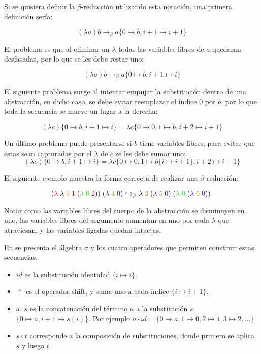\documentclass[]{report}
\begin{document}
	Si se quisiera definir la $\beta$-reducción utilizando esta notación, una primera definición sería:
	
	\[ (\lambda a)b \rightarrow_{\beta} a \{ 0 \mapsto b, i+1\mapsto i+1 \} \]
	
	El problema es que al eliminar un $\lambda$ todas las variables libres de $a$ quedaran desfasadas, por lo que se les debe restar uno:
	
	\[ (\lambda a)b \rightarrow_{\beta} a \{ 0 \mapsto b, i+1\mapsto i \} \]
	
	El siguiente problema surge al intentar empujar la substitución dentro de una abstracción, en dicho caso, se debe evitar reemplazar el índice 0 por $b$, por lo que toda la secuencia se mueve un lugar a la derecha:
	
	\[ (\lambda c)\{ 0 \mapsto b, i+1\mapsto i \} = \lambda c \{ 0 \mapsto 0, 1 \mapsto b, i+2\mapsto i+1 \} \]
	
	Un último problema puede presentarse si $b$ tiene variables libres, para evitar que estas sean capturadas por el $\lambda$ de $c$ se les debe sumar uno:
	\[ (\lambda c)\{ 0 \mapsto b, i+1\mapsto i \} = \lambda c \{ 0 \mapsto 0, 1 \mapsto b \{ i \mapsto i+1 \}, i+2\mapsto i+1 \} \]
	
	El siguiente ejemplo muestra la forma correcta de realizar una $\beta$ reducción:
	
	\[
	(\textcolor{red}{\lambda}\; \lambda\; \textcolor{orange}{3}\; \textcolor{red}{1}\; (\textcolor{green}{\lambda\; 0}\; \textcolor{red}{2}))\; (\textcolor{blue}{\lambda}\; \textcolor{orange}{4}\; \textcolor{blue}{0})
	\hookrightarrow_\beta
	\lambda \; \textcolor{orange}{2} \; (\textcolor{blue}{\lambda}\; \textcolor{orange}{5}\; \textcolor{blue}{0})\; (\textcolor{green}{\lambda\; 0}\; (\textcolor{blue}{\lambda}\; \textcolor{orange}{6}\; \textcolor{blue}{0}))\;
	\]
	
	Notar como las variables libres del cuerpo de la abstracción se disminuyen en uno, las variables libres del argumento aumentan en uno por cada $\lambda$ que atraviesan, y las variables ligadas quedan intactas.
	
	
	En \cite{explicit_subs} se presenta el álgebra $\sigma$ y los cuatro operadores que permiten construir estas secuencias.

	\begin{itemize}
		\item $id$ es la substitución identidad $\{i \mapsto i\}$.
		\item $\uparrow$ es el operador shift, y suma uno a cada índice $\{i \mapsto i+1\}$.
		\item $a \cdot s$ es la concatenación del término $a$ a la substitución $s$, $\{0 \mapsto a, i+1 \mapsto s(i)\}$. Por ejemplo $a \cdot id = \{ 0 \mapsto a, 1 \mapsto 0, 2 \mapsto 1, 3 \mapsto 2, \dots \} $
		\item $s \circ t$ corresponde a la composición de substituciones, donde primero se aplica $s$ y luego $t$.
	\end{itemize}
	
\end{document}
